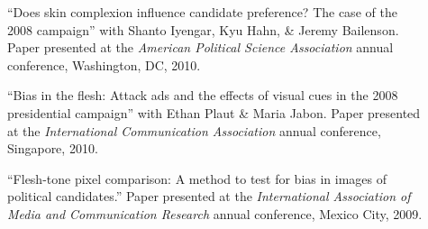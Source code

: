 \documentclass[letterpaper,11pt]{article}
\newcommand{\resheading}[1]{\vspace{4pt}{\large
\colorbox{mygrey}{\begin{minipage}{\textwidth}{\textbf{#1
\vphantom{p\^{E}}}}\end{minipage}}}\vspace{4pt}}
\begin{document}
\begin{description}
\item[] ``Does skin complexion influence candidate preference? The case of the 2008 campaign'' with Shanto Iyengar, Kyu
Hahn, \& Jeremy Bailenson. Paper presented at the \emph{American Political Science Association}
annual conference, Washington, DC, 2010. 

\item[] ``Bias in the flesh: Attack ads and the effects of visual cues in the 2008 presidential campaign'' with Ethan Plaut \& Maria Jabon. Paper presented at the \emph{International Communication Association} annual conference, Singapore, 2010.

\item[] ``Flesh-tone pixel comparison: A method to test for bias in images of political candidates.'' Paper presented at the \emph{International Association of Media and Communication Research} annual conference, Mexico City, 2009.
\end{description}

%
\end{document}

